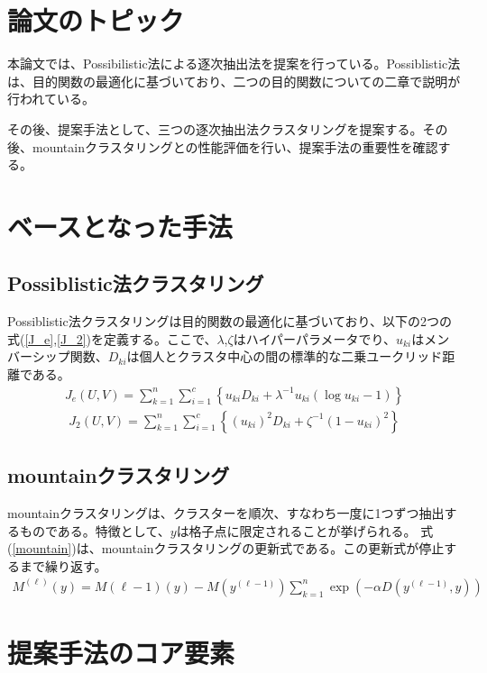 \documentclass[10pt,onecolumn]{jsarticle}
\begin{document}
\section{論文のトピック}
本論文では、Possibilistic法による逐次抽出法を提案を行っている。Possiblistic法は、目的関数の最適化に基づいており、二つの目的関数についての二章で説明が行われている。

その後、提案手法として、三つの逐次抽出法クラスタリングを提案する。その後、mountainクラスタリングとの性能評価を行い、提案手法の重要性を確認する。
\section{ベースとなった手法}
\subsection{Possiblistic法クラスタリング}
Possiblistic法クラスタリングは目的関数の最適化に基づいており、以下の2つの式(\ref{J_e},\ref{J_2})を定義する。ここで、$\lambda$,$\zeta$はハイパーパラメータでり、$u_{ki}$はメンバーシップ関数、$D_{ki}$は個人とクラスタ中心の間の標準的な二乗ユークリッド距離である。
\begin{align}
	\label{J_e}
	J_{e}(U, V)=\sum_{k=1}^{n} \sum_{i=1}^{c}\left\{u_{k i} D_{k i}+\lambda^{-1} u_{k i}\left(\log u_{k i}-1\right)\right\}
\end{align}
\begin{align}
	\label{J_2}
	J_{2}(U, V)=\sum_{k=1}^{n} \sum_{i=1}^{c}\left\{\left(u_{k i}\right)^{2} D_{k i}+\zeta^{-1}\left(1-u_{k i}\right)^{2}\right\}
\end{align}

\subsection{mountainクラスタリング}
mountainクラスタリングは、クラスターを順次、すなわち一度に1つずつ抽出するものである。特徴として、$y$は格子点に限定されることが挙げられる。
式(\ref{mountain})は、mountainクラスタリングの更新式である。この更新式が停止するまで繰り返す。
\begin{align}
	\label{mountain}
	M^{(\ell)}(y)=M(\ell-1)(y)-M\left(y^{(\ell-1)}\right) \sum_{k=1}^{n} \exp \left(-\alpha D\left(y^{(\ell-1)}, y\right)\right)
\end{align}
\section{提案手法のコア要素}
\end{document}
